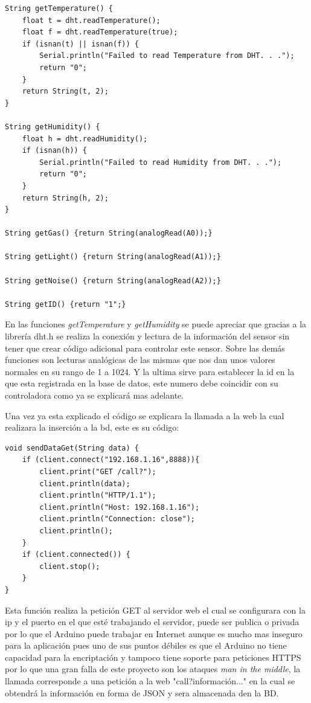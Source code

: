 \begin{lstlisting}
String getTemperature() {
	float t = dht.readTemperature();
	float f = dht.readTemperature(true);
	if (isnan(t) || isnan(f)) {
		Serial.println("Failed to read Temperature from DHT. . .");
		return "0";
	}
	return String(t, 2);
}

String getHumidity() {
	float h = dht.readHumidity();
	if (isnan(h)) {
		Serial.println("Failed to read Humidity from DHT. . .");
		return "0";
	}
	return String(h, 2);
}

String getGas() {return String(analogRead(A0));}

String getLight() {return String(analogRead(A1));}

String getNoise() {return String(analogRead(A2));}

String getID() {return "1";}
\end{lstlisting}

En las funciones \textit{getTemperature} y \textit{getHumidity} se puede apreciar que gracias a la librería dht.h se realiza la conexión y lectura de la información del sensor sin tener que crear código adicional para controlar este sensor. Sobre las demás funciones son lecturas analógicas de las mismas que nos dan unos valores normales en su rango de 1 a 1024. Y la ultima sirve para establecer la id en la que esta registrada en la base de datos, este numero debe coincidir con su controladora como ya se explicará mas adelante.

Una vez ya esta explicado el código se explicara la llamada a la web la cual realizara la inserción a la bd, este es su código:

\begin{lstlisting}
void sendDataGet(String data) {
	if (client.connect("192.168.1.16",8888)){
		client.print("GET /call?");
		client.println(data);
		client.println("HTTP/1.1");
		client.println("Host: 192.168.1.16");        
		client.println("Connection: close");
		client.println();
	}
	if (client.connected()) { 
		client.stop();
	}
}
\end{lstlisting}

Esta función realiza la petición GET al servidor web el cual se configurara con la ip y el puerto en el que esté trabajando el servidor, puede ser publica o privada por lo que el Arduino puede trabajar en Internet aunque es mucho mas inseguro para la aplicación pues uno de sus puntos débiles es que el Arduino no tiene capacidad para la encriptación y tampoco tiene soporte para peticiones HTTPS por lo que una gran falla de este proyecto son los ataques \textit{man in the middle}, la llamada corresponde a una petición a la web "call?información..." en la cual se obtendrá la información en forma de JSON y sera almacenada den la BD.

